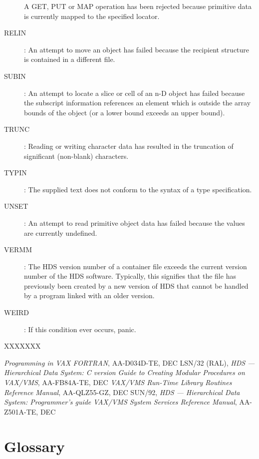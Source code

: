 \begin{description}
A GET, PUT or MAP operation has been rejected because primitive data is
currently mapped to the specified locator.
\item [RELIN]:
An attempt to move an object has failed because the recipient structure is
contained in a different file.
\item [SUBIN]:
An attempt to locate a slice or cell of an n-D object has failed
because the subscript information references an element which is outside the
array bounds of the object (or a lower bound exceeds an upper bound).
\item [TRUNC]:
Reading or writing character data has resulted in the truncation of significant
(non-blank) characters.
\item [TYPIN]:
The supplied text does not conform to the syntax of a type specification.
\item [UNSET]:
An attempt to read primitive object data has failed because the values are
currently undefined.
\item [VERMM]:
The HDS version number of a container file exceeds the current version number
of the HDS software.
Typically, this signifies that the file has previously been created by a new
version of HDS that cannot be handled by a program linked with an older version.
\item [WEIRD]:
If this condition ever occurs, panic.
\end{description}

\begin {thebibliography}{XXXXXXX}
 {\em Programming in VAX FORTRAN},
AA-D034D-TE, DEC
 LSN/32 (RAL), {\em HDS --- Hierarchical Data System: C
version}
 {\em Guide to Creating Modular
Procedures on VAX/VMS}, AA-FB84A-TE, DEC
 {\em VAX/VMS Run-Time Library
Routines Reference Manual}, AA-QLZ55-GZ, DEC
 SUN/92, {\em HDS --- Hierarchical Data System:
Programmer's guide}
 {\em VAX/VMS System Services
Reference Manual}, AA-Z501A-TE, DEC
\end {thebibliography}

\section* {Glossary}


